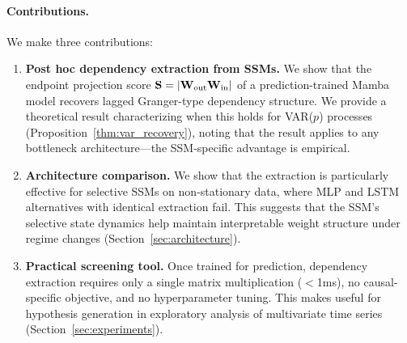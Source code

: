 \paragraph{Contributions.} We make three contributions:
\begin{enumerate}
    \item \textbf{Post hoc dependency extraction from SSMs.} We show that
    the endpoint projection score $\mathbf{S} = |\mathbf{W}_{\text{out}} \mathbf{W}_{\text{in}}|$
    of a prediction-trained Mamba model recovers lagged Granger-type
    dependency structure. We provide a theoretical result characterizing
    when this holds for VAR($p$) processes
    (Proposition~\ref{thm:var_recovery}), noting that the result applies
    to any bottleneck architecture---the SSM-specific advantage is
    empirical.

    \item \textbf{Architecture comparison.} We show that the extraction is
    particularly effective for selective SSMs on non-stationary data, where
    MLP and LSTM alternatives with identical extraction fail. This suggests
    that the SSM's selective state dynamics help maintain interpretable
    weight structure under regime changes
    (Section~\ref{sec:architecture}).

    \item \textbf{Practical screening tool.} Once trained for prediction,
    dependency extraction requires only a single matrix multiplication
    ($<$1ms), no causal-specific objective, and no hyperparameter tuning.
    This makes \methodname{} useful for hypothesis generation in
    exploratory analysis of multivariate time series
    (Section~\ref{sec:experiments}).
\end{enumerate}
